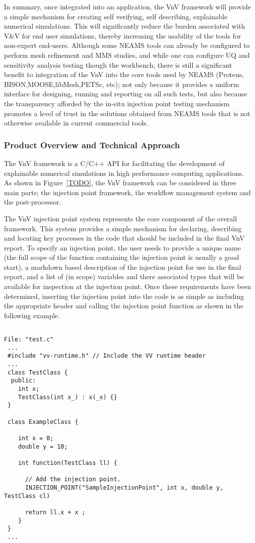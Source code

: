 In summary, once integrated into an application, the VnV framework will provide a simple mechanism for creating self verifying, self describing, explainable numerical simulations. This will significantly reduce the burden associated with V&V for end user simulations, thereby increasing the usability of the tools for non-expert end-users. Although some NEAMS tools can already be configured to perform mesh refinement and MMS studies, and while one can configure UQ and sensitivity analysis testing though the workbench, there is still a significant benefit to integration of the VnV into the core tools used by NEAMS (Proteus, BISON,MOOSE,libMesh,PETSc, etc); not only because it provides a uniform interface for designing, running and reporting on all such tests, but also because the transparency afforded by the in-situ injection point testing mechanism promotes a level of trust in the solutions obtained from NEAMS tools that is not otherwise available in current commercial tools. 

\subsubsection{Product Overview and Technical Approach}

The VnV framework is a C/C++ API for facilitating the development of explainable numerical simulations in high performance computing applications. As shown in Figure~\ref{TODO}, the VnV framework 
can be considered in three main parts; the injection point framework, the workflow management system and the post-processor.

The VnV injection point system represents the core component of the overall framework. This system provides a simple mechanism for 
declaring, describing and locating key processes in the code that should be included in the final VnV report. To specify an injection
point, the user needs to provide a unique name (the full scope of the function containing the injection point is usually a good start), a 
markdown based description of the injection point for use in the final report, and a list of (in scope) variables and there associated types that 
will be available for inspection at the injection point. Once these requirements have been determined, inserting the injection point into the code
is as simple as including the appropriate header and calling the injection point function as shown in the following example. 

\begin{verbatim}

File: "test.c" 
 ...
 #include "vv-runtime.h" // Include the VV runtime header 
 ...
 class TestClass {
  public:
    int x;
    TestClass(int x_) : x(_x) {}
 }
 
 class ExampleClass {
 
    int x = 0;
    double y = 10;
    
    int function(TestClass ll) {

      // Add the injection point. 
      INJECTION_POINT("SampleInjectionPoint", int x, double y, TestClass cl) 

      return ll.x + x ;
    }
 }
 ...
\end{verbatim}

